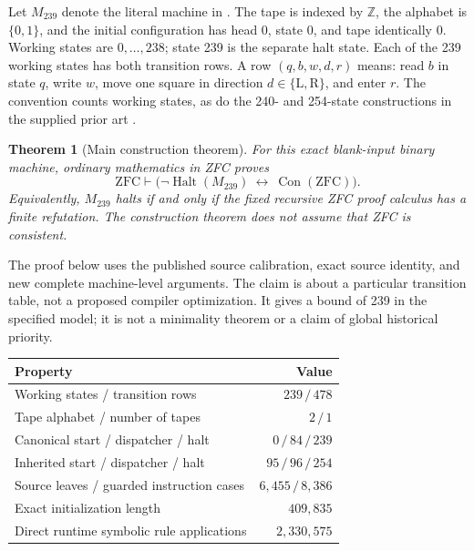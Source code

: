 \documentclass[11pt,a4paper]{article}
\newcommand{\Con}{\operatorname{Con}}
\newcommand{\Halt}{\operatorname{Halt}}
\newcommand{\ZFC}{\mathrm{ZFC}}
\newcommand{\file}[1]{\texttt{\detokenize{#1}}}
\newtheorem{theorem}{Theorem}
\begin{document}
Let $M_{239}$ denote the literal machine in \file{machines/zfc239.tm}.
The tape is indexed by $\mathbb Z$, the alphabet is $\{0,1\}$, and the
initial configuration has head 0, state 0, and tape identically 0.
Working states are $0,\ldots,238$; state 239 is the separate halt state.
Each of the 239 working states has both transition rows. A row
$(q,b,w,d,r)$ means: read $b$ in state $q$, write $w$, move one square in
direction $d\in\{\mathrm L,\mathrm R\}$, and enter $r$.
The convention counts working states, as do the 240- and 254-state
constructions in the supplied prior art \cite{wiki,m254,rotation240}.

\begin{theorem}[Main construction theorem]
For this exact blank-input binary machine, ordinary mathematics in ZFC
proves
\[
 \ZFC\vdash
 \bigl(\neg\Halt(M_{239})\ \longleftrightarrow\ \Con(\ZFC)\bigr).
\]
Equivalently, $M_{239}$ halts if and only if the fixed recursive ZFC
proof calculus has a finite refutation. The construction theorem does
not assume that ZFC is consistent.
\end{theorem}

The proof below uses the published source calibration, exact source
identity, and new complete machine-level arguments. The claim is about
a particular transition table, not a proposed compiler optimization.
It gives a bound of 239 in the specified model; it is not a minimality
theorem or a claim of global historical priority.

\begin{center}
\begin{tabular}{lr}
\toprule
Property & Value\\
\midrule
Working states / transition rows & $239\,/\,478$\\
Tape alphabet / number of tapes & $2\,/\,1$\\
Canonical start / dispatcher / halt & $0\,/\,84\,/\,239$\\
Inherited start / dispatcher / halt & $95\,/\,96\,/\,254$\\
Source leaves / guarded instruction cases & $6,455\,/\,8,386$\\
Exact initialization length & $409,835$\\
Direct runtime symbolic rule applications & $2,330,575$\\
\bottomrule
\end{tabular}
\end{center}
\end{document}
